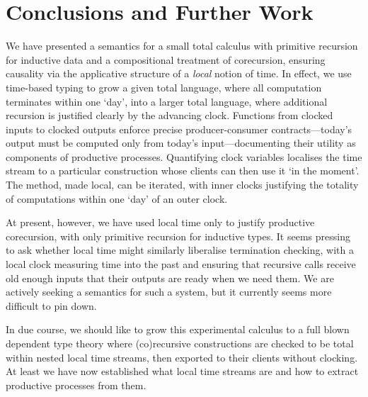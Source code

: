 \section{Conclusions and Further Work}
\label{sec:conclusions}

We have presented a semantics for a small total calculus with
primitive recursion for inductive data and a compositional treatment
of corecursion, ensuring causality via the applicative structure of a
\emph{local} notion of time. In effect, we use time-based typing to
grow a given total language, where all computation terminates within
one `day', into a larger total language, where additional recursion is
justified clearly by the advancing clock. Functions from clocked
inputs to clocked outputs enforce precise producer-consumer
contracts---today's output must be computed only from today's
input---documenting their utility as components of productive
processes. Quantifying clock variables localises the time stream to a
particular construction whose clients can then use it `in the moment'.
The method, made local, can be iterated, with inner clocks justifying
the totality of computations within one `day' of an outer clock.

At present, however, we have used local time only to justify
productive corecursion, with only primitive recursion for inductive
types. It seems pressing to ask whether local time might similarly
liberalise termination checking, with a local clock measuring time into
the past and ensuring that recursive calls receive old enough inputs
that their outputs are ready when we need them. We are actively
seeking a semantics for such a system, but it currently seems more
difficult to pin down.

In due course, we should like to grow this experimental calculus to a
full blown dependent type theory where (co)recursive constructions are
checked to be total within nested local time streams, then exported to their
clients without clocking. At least we have now established what local
time streams are and how to extract productive processes from them.


